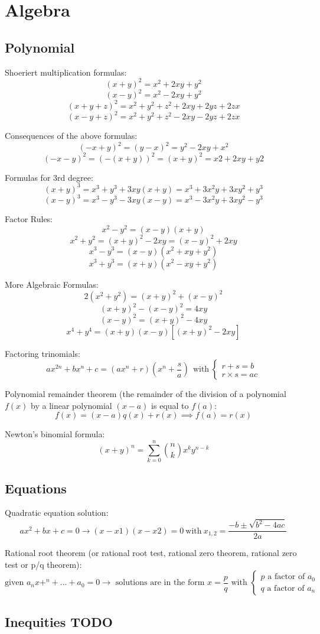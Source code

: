 \chapter{Algebra}

\section{Polynomial}
Shoeriert multiplication formulas:
$$(x + y)^2 = x^2 + 2xy + y^2$$
$$(x - y)^2 = x^2 - 2xy + y^2$$ 
$$(x + y + z)^2 = x^2 + y^2 + z^2 + 2xy + 2yz + 2zx$$ 
$$(x - y + z)^2 = x^2 + y^2 + z^2 - 2xy - 2yz + 2zx$$ 

Consequences of the above formulas:
$$(-x + y)^2 = (y - x)^2 = y^2 - 2xy + x^2$$
$$(-x - y)^2 = (-(x + y))^2 = (x + y)^2 = x2 + 2xy + y2$$

Formulas for 3rd degree:
$$(x + y)^3 = x^3 + y^3 + 3xy(x + y) = x^3 + 3x^2y + 3xy^2 + y^3$$
$$(x - y)^3 = x^3 - y^3 - 3xy(x - y) = x^3 - 3x^2y + 3xy^2 - y^3$$

Factor Rules:
$$x^2 - y^2 = (x - y)(x + y)$$
$$x^2 + y^2 = (x + y)^2 - 2xy = (x - y)^2 + 2xy$$
$$x^3 - y^3 = (x - y)(x^2 + xy + y^2)$$
$$x^3 + y^3 = (x + y)(x^2 - xy + y^2)$$

More Algebraic Formulas:
$$2(x^2 + y^2) = (x + y)^2 + (x - y)^2$$
$$(x + y)^2 - (x - y)^2 = 4xy$$
$$(x - y)^2 = (x + y)^2 - 4xy$$
$$x^4 + y^4 = (x + y)(x - y)[(x + y)^2 - 2xy]$$

Factoring trinomials:
$$ ax^{2n} + bx^n + c = (ax^n + r)(x^n + \frac{s}{a}) ~~ \text{with} ~ \begin{cases} 
                                                                  r + s = b \\
                                                                  r \times s = ac
                                                                 \end{cases}
$$

Polynomial remainder theorem (the remainder of the division of a polynomial $f(x)$ by a linear polynomial ${(x-a)}$ is equal to $f(a)$:
$$ f(x) = (x-a)q(x) + r(x) \implies f(a) = r(x) $$

Newton's binomial formula:
\[ (x+y)^n = \sum_{k=0}^{n}\binom{n}{k}x^ky^{n-k} \]

\section{Equations}
Quadratic equation solution:
$$ ax^2 + bx + c = 0 \rightarrow (x - x1)(x - x2) = 0 ~\text{with}~ x_{1,2}=\frac{-b\pm\sqrt{b^2-4ac}}{2a}$$

Rational root theorem (or rational root test, rational zero theorem, rational zero test or p/q theorem): 
$$
\text{given } a_nx+^n+...+a_0=0 \rightarrow \text{ solutions are in the form } x=\frac{p}{q} \text{ with } \begin{cases}
p \text{ a factor of } a_0 \\
q \text{ a factor of } a_n
\end{cases}
$$


\section{Inequities TODO}